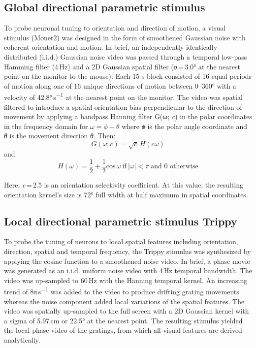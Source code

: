 \documentclass{article}
\begin{document}
\subsection*{Global directional parametric stimulus}

To probe neuronal tuning to orientation and direction of motion, a visual stimulus (Monet2) was designed in the form of smoothened Gaussian noise with coherent orientation and motion. In brief, an independently identically distributed (i.i.d.) Gaussian noise video was passed through a temporal low-pass Hamming filter (4\,Hz) and a 2D Gaussian spatial filter (\emph{σ}\,=\,3.0° at the nearest point on the monitor to the mouse). Each 15-s block consisted of 16 equal periods of motion along one of 16 unique directions of motion between 0–360° with a velocity of 42.8°\,s\textsuperscript{−1} at the nearest point on the monitor. The video was spatial filtered to introduce a spatial orientation bias perpendicular to the direction of movement by applying a bandpass Hanning filter G(\emph{ω}; \emph{c}) in the polar coordinates in the frequency domain for $\omega = \phi - \theta$ where \emph{ϕ} is the polar angle coordinate and \emph{θ} is the movement direction \emph{θ}. Then:
\[ G(\omega; c) = \sqrt{c}\, H(c\omega) \]
and
\[ H(\omega) = \frac{1}{2} + \frac{1}{2}\mathrm{cos}\,\omega \ \text{if}\ |\omega| < \pi \ \text{and 0 otherwise} \]

Here, \emph{c}\,=\,2.5 is an orientation selectivity coefficient. At this value, the resulting orientation kernel’s size is 72° full width at half maximum in spatial coordinates.

\subsection*{Local directional parametric stimulus Trippy}

To probe the tuning of neurons to local spatial features including orientation, direction, spatial and temporal frequency, the Trippy stimulus was synthesized by applying the cosine function to a smoothened noise video. In brief, a phase movie was generated as an i.i.d. uniform noise video with 4\,Hz temporal bandwidth. The video was up-sampled to 60\,Hz with the Hanning temporal kernel. An increasing trend of 8π\,s\textsuperscript{−1} was added to the video to produce drifting grating movements whereas the noise component added local variations of the spatial features. The video was spatially up-sampled to the full screen with a 2D Gaussian kernel with a sigma of 5.97\,cm or 22.5° at the nearest point. The resulting stimulus yielded the local phase video of the gratings, from which all visual features are derived analytically.
\end{document}
